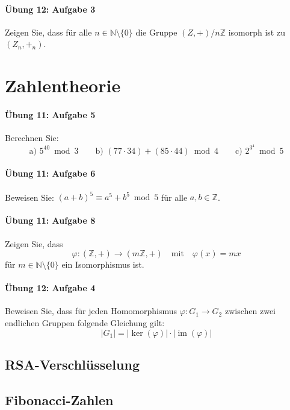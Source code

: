 \documentclass
[
  draft    = true,
  fontsize = 11pt,
  parskip  = half-,
  BCOR     = 0pt,
  DIV      = 11,
  ngerman,
  dvipsnames
]
{scrartcl}
\begin{document}
\paragraph{Übung 12: Aufgabe 3}
Zeigen Sie, dass für alle $n\in\mathbb{N}\setminus\{0\}$ die Gruppe
$(Z,+)/n\mathbb{Z}$ isomorph ist zu $(Z_n, +_n)$.

\section{Zahlentheorie}

\paragraph{Übung 11: Aufgabe 5}
Berechnen Sie:
\begin{equation*}
  \text{a) }5^{40}\bmod3
  \qquad
  \text{b) }(77\cdot34)+(85\cdot44)\bmod4
  \qquad
  \text{c) }2^{3^4}\bmod5
\end{equation*}

\paragraph{Übung 11: Aufgabe 6}
Beweisen Sie: $(a+b)^5\equiv a^5+b^5\bmod5$ für alle $a,b\in\mathbb{Z}$.

\paragraph{Übung 11: Aufgabe 8}
Zeigen Sie, dass
\begin{equation*}
  \varphi:(\mathbb{Z},+)\rightarrow(m\mathbb{Z},+)\quad\text{mit}\quad\varphi(x)=mx
\end{equation*}
für $m\in\mathbb{N}\setminus\{0\}$ ein Isomorphismus ist.

\paragraph{Übung 12: Aufgabe 4}
Beweisen Sie, dass für jeden Homomorphismus $\varphi:G_1\rightarrow G_2$
zwischen zwei endlichen Gruppen folgende Gleichung gilt:
\begin{equation*}
  |G_1|=|\ker(\varphi)|\cdot|\operatorname{im}(\varphi)|
\end{equation*}

\subsection{RSA-Verschlüsselung}

\subsection{Fibonacci-Zahlen}

\end{document}
